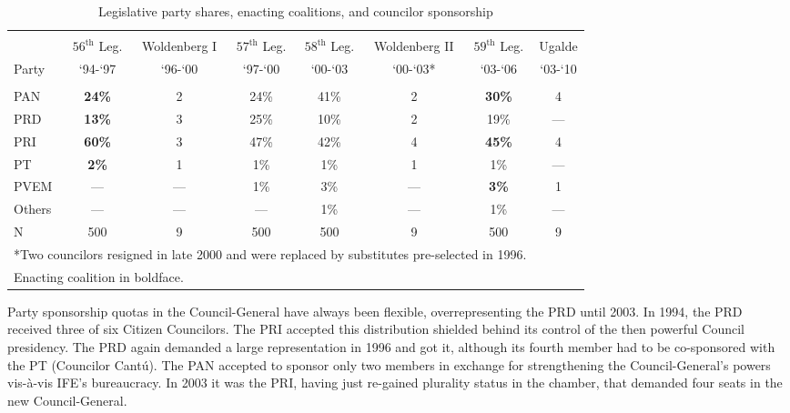 \documentclass[12 pt, letter]{article}
\begin{document}
\begin{sidewaystable}
\caption{Legislative party shares, enacting coalitions, and
councilor sponsorship}\label{T:proposals}
\begin{center}
\begin{tabular}{lccccccc}
\hline\\ [-1.5ex]
      & $56^{\text{th}}$ Leg. & Woldenberg I & $57^{\text{th}}$ Leg. & $58^{\text{th}}$ Leg. & Woldenberg II & $59^{\text{th}}$ Leg. & Ugalde \\
Party &  `94-`97  &  `96-`00  &  `97-`00  &  `00-`03  &  `00-`03*  &  `03-`06  &  `03-`10 \\
\hline\\ [-1ex]
 PAN  & \textbf{24\%} & 2   & 24\% & 41\% & 2   & \textbf{30\%} & 4   \\
 PRD  & \textbf{13\%} & 3   & 25\% & 10\% & 2   & 19\%          & --- \\
 PRI  & \textbf{60\%} & 3   & 47\% & 42\% & 4   & \textbf{45\%} & 4   \\
 PT   & \textbf{ 2\%} & 1   &  1\% &  1\% & 1   & 1\%           & --- \\
 PVEM & ---           & --- &  1\% &  3\% & --- & \textbf{3\%}  & 1   \\
 Others & ---         & --- &  --- &  1\% & --- & 1\%           & --- \\
 N    & 500           & 9   &  500 &  500 & 9   & 500           & 9   \\
\hline
\multicolumn{7}{l}{\footnotesize{*Two councilors resigned in late 2000 and were replaced by substitutes pre-selected in 1996.}}\\
\multicolumn{7}{l}{\footnotesize{Enacting coalition in boldface.}}\\
\end{tabular}
\end{center}
\end{sidewaystable}

Party sponsorship quotas in the Council-General have always been flexible, overrepresenting the PRD until 2003.  In 1994, the PRD received three of six Citizen Councilors.  The PRI accepted this distribution shielded behind its control of the then powerful Council presidency.  The PRD again demanded a large representation in 1996 and got it, although its fourth member had to be co-sponsored with the PT (Councilor Cant\'u).  The PAN accepted to sponsor only two members in exchange for strengthening the Council-General's powers vis-\`{a}-vis IFE's bureaucracy.  In 2003 it was the PRI, having just re-gained plurality status in the chamber, that demanded four seats in the new Council-General.  
\end{document}

